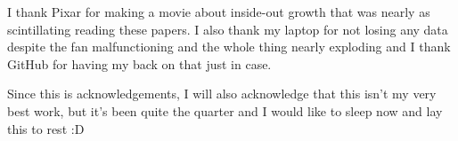 \documentclass[preprint2]{aastex631}
\begin{document}
\begin{acknowledgements}
    I thank Pixar for making a movie about inside-out growth that was nearly as scintillating reading these papers. I also thank my laptop for not losing any data despite the fan malfunctioning and the whole thing nearly exploding and I thank GitHub for having my back on that just in case.
    
    Since this is acknowledgements, I will also acknowledge that this isn't my very best work, but it's been quite the quarter and I would like to sleep now and lay this to rest :D
\end{acknowledgements}


{}
\end{document}
